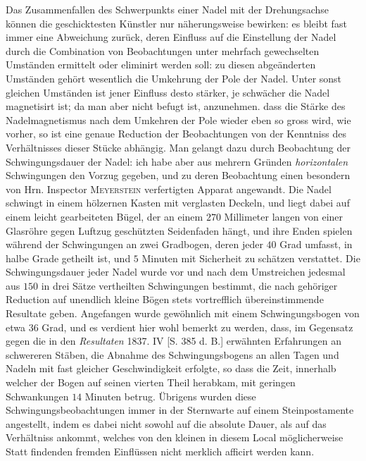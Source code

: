 Das Zusammenfallen des Schwerpunkts einer Nadel mit der Drehungsachse können die geschicktesten Künstler nur näherungsweise bewirken: es bleibt fast immer eine Abweichung zurück, deren Einfluss auf die Einstellung der Nadel durch die Combination von Beobachtungen unter mehrfach gewechselten Umständen ermittelt oder eliminirt werden soll: zu diesen abgeänderten Umständen gehört wesentlich die Umkehrung der Pole der Nadel. Unter sonst gleichen Umständen ist jener Einfluss desto stärker, je schwächer die Nadel magnetisirt ist; da man aber nicht befugt ist, anzunehmen. dass die Stärke des Nadelmagnetismus nach dem Umkehren der Pole wieder eben so gross wird, wie vorher, so ist eine genaue Reduction der Beobachtungen von der Kenntniss des Verhältnisses dieser Stücke abhängig. Man gelangt dazu durch Beobachtung der Schwingungsdauer der Nadel: ich habe aber aus mehrern Gründen \textit{horizontalen} Schwingungen den Vorzug gegeben, und zu deren Beobachtung einen besondern von Hrn. Inspector \textsc{Meyerstein} verfertigten Apparat angewandt. Die Nadel schwingt in einem hölzernen Kasten mit verglasten Deckeln, und liegt dabei auf einem leicht gearbeiteten Bügel, der an einem $270$ Millimeter langen von einer Glasröhre gegen Luftzug geschützten Seidenfaden hängt, und ihre Enden spielen während der Schwingungen an zwei Gradbogen, deren jeder $40$ Grad umfasst, in halbe Grade getheilt ist, und $5$ Minuten mit Sicherheit zu schätzen verstattet. Die Schwingungsdauer jeder Nadel wurde vor und nach dem Umstreichen jedesmal aus $150$ in drei Sätze vertheilten Schwingungen bestimmt, die nach gehöriger Reduction auf unendlich kleine Bögen stets vortrefflich übereinstimmende Resultate geben. Angefangen wurde gewöhnlich mit einem Schwingungsbogen von etwa $36$ Grad, und es verdient hier wohl bemerkt zu werden, dass, im Gegensatz gegen die in den \textit{Resultaten} 1837. IV [S. 385 d. B.] erwähnten Erfahrungen an schwereren Stäben, die Abnahme des Schwingungsbogens an allen Tagen und Nadeln mit fast gleicher Geschwindigkeit erfolgte, so dass die Zeit, innerhalb welcher der Bogen auf seinen vierten Theil herabkam, mit geringen Schwankungen $14$ Minuten betrug. Übrigens wurden diese Schwingungsbeobachtungen immer in der Sternwarte auf einem Steinpostamente angestellt, indem es dabei nicht sowohl auf die absolute Dauer, als auf das Verhältniss ankommt, welches von den kleinen in diesem Local möglicherweise Statt findenden fremden Einflüssen nicht merklich afficirt werden kann.

